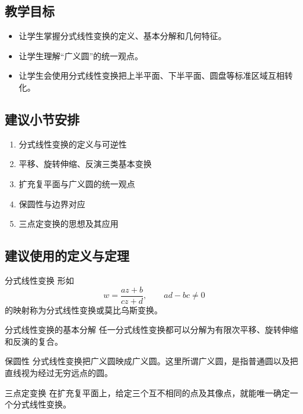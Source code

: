 \subsection*{教学目标}
\begin{itemize}
    \item 让学生掌握分式线性变换的定义、基本分解和几何特征。
    \item 让学生理解``广义圆''的统一观点。
    \item 让学生会使用分式线性变换把上半平面、下半平面、圆盘等标准区域互相转化。
\end{itemize}

\subsection*{建议小节安排}
\begin{enumerate}
    \item 分式线性变换的定义与可逆性
    \item 平移、旋转伸缩、反演三类基本变换
    \item 扩充复平面与广义圆的统一观点
    \item 保圆性与边界对应
    \item 三点定变换的思想及其应用
\end{enumerate}

\subsection*{建议使用的定义与定理}
\begin{dingliyi}{分式线性变换}{}
形如
\[
    w=\frac{az+b}{cz+d},
    \qquad ad-bc\neq 0
\]
的映射称为分式线性变换或莫比乌斯变换。
\end{dingliyi}

\begin{dingli}{分式线性变换的基本分解}{}
任一分式线性变换都可以分解为有限次平移、旋转伸缩和反演的复合。
\end{dingli}

\begin{dingli}{保圆性}{}
分式线性变换把广义圆映成广义圆。这里所谓广义圆，是指普通圆以及把直线视为经过无穷远点的圆。
\end{dingli}

\begin{dingli}{三点定变换}{}
在扩充复平面上，给定三个互不相同的点及其像点，就能唯一确定一个分式线性变换。
\end{dingli}

